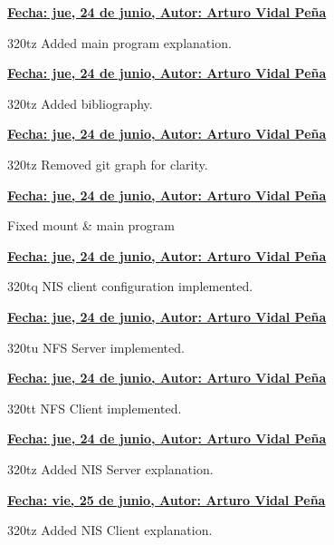 \item \textbf{\underline{\underline{Fecha:} jue, 24 de junio, \underline{Autor:} Arturo Vidal Peña}}\\\item[]320tz Added main program explanation.\\
\item \textbf{\underline{\underline{Fecha:} jue, 24 de junio, \underline{Autor:} Arturo Vidal Peña}}\\\item[]320tz Added bibliography.\\
\item \textbf{\underline{\underline{Fecha:} jue, 24 de junio, \underline{Autor:} Arturo Vidal Peña}}\\\item[]320tz Removed git graph for clarity.\\
\item \textbf{\underline{\underline{Fecha:} jue, 24 de junio, \underline{Autor:} Arturo Vidal Peña}}\\\item[] Fixed mount \& main program\\
\item \textbf{\underline{\underline{Fecha:} jue, 24 de junio, \underline{Autor:} Arturo Vidal Peña}}\\\item[]320tq NIS client configuration implemented.\\
\item \textbf{\underline{\underline{Fecha:} jue, 24 de junio, \underline{Autor:} Arturo Vidal Peña}}\\\item[]320tu NFS Server implemented.\\
\item \textbf{\underline{\underline{Fecha:} jue, 24 de junio, \underline{Autor:} Arturo Vidal Peña}}\\\item[]320tt NFS Client implemented.\\
\item \textbf{\underline{\underline{Fecha:} jue, 24 de junio, \underline{Autor:} Arturo Vidal Peña}}\\\item[]320tz Added NIS Server explanation.\\
\item \textbf{\underline{\underline{Fecha:} vie, 25 de junio, \underline{Autor:} Arturo Vidal Peña}}\\\item[]320tz Added NIS Client explanation.\\
